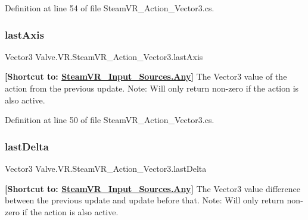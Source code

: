 Definition at line 54 of file Steam\+V\+R\+\_\+\+Action\+\_\+\+Vector3.\+cs.

\mbox{\label{class_valve_1_1_v_r_1_1_steam_v_r___action___vector3_a80ebc3715ac17d087f83064081fc5b70}} 
\subsubsection{\texorpdfstring{lastAxis}{lastAxis}}
{\footnotesize\ttfamily Vector3 Valve.\+V\+R.\+Steam\+V\+R\+\_\+\+Action\+\_\+\+Vector3.\+last\+Axis\hspace{0.3cm}{\ttfamily [get]}}



{\bfseries{\mbox{[}Shortcut to\+: \mbox{\hyperlink{namespace_valve_1_1_v_r_a82e5bf501cc3aa155444ee3f0662853faed36a1ef76a59ee3f15180e0441188ad}{Steam\+V\+R\+\_\+\+Input\+\_\+\+Sources.\+Any}}\mbox{]}}} The Vector3 value of the action from the previous update. Note\+: Will only return non-\/zero if the action is also active. 



Definition at line 50 of file Steam\+V\+R\+\_\+\+Action\+\_\+\+Vector3.\+cs.

\mbox{\label{class_valve_1_1_v_r_1_1_steam_v_r___action___vector3_a3cd18f9f22012f93b408132d661340d0}} 
\subsubsection{\texorpdfstring{lastDelta}{lastDelta}}
{\footnotesize\ttfamily Vector3 Valve.\+V\+R.\+Steam\+V\+R\+\_\+\+Action\+\_\+\+Vector3.\+last\+Delta\hspace{0.3cm}{\ttfamily [get]}}



{\bfseries{\mbox{[}Shortcut to\+: \mbox{\hyperlink{namespace_valve_1_1_v_r_a82e5bf501cc3aa155444ee3f0662853faed36a1ef76a59ee3f15180e0441188ad}{Steam\+V\+R\+\_\+\+Input\+\_\+\+Sources.\+Any}}\mbox{]}}} The Vector3 value difference between the previous update and update before that. Note\+: Will only return non-\/zero if the action is also active. 



